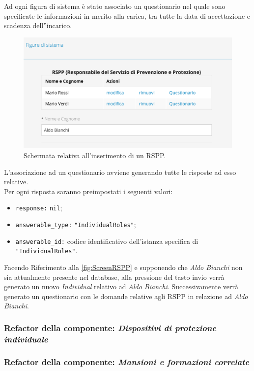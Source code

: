 	Ad ogni figura di sistema è stato associato un questionario nel quale sono specificate le informazioni in merito alla carica, tra tutte la data di accettazione e scadenza dell''incarico.
	\begin{figure}[H]
		\begin{center}
			\includegraphics[width=12cm]{Pics/RemoteTrueRSPP.png}
			\caption{
				Schermata relativa all'inserimento di un RSPP.}
			\label{fig:ScreenRSPP}
		\end{center}
	\end{figure}	
	  L'associazione ad un questionario avviene generando tutte le risposte ad esso relative.\\
	  Per ogni risposta saranno preimpostati i seguenti valori:
	  \begin{itemize}
		  \item \texttt{response:} \texttt{nil};
		  \item \texttt{answerable\_type:} \texttt{"IndividualRoles"};
		  \item \texttt{answerable\_id:} codice identificativo dell'istanza specifica di \texttt{"IndividualRoles"}.
	  \end{itemize}

	Facendo Riferimento alla \autoref{fig:ScreenRSPP} e  supponendo che \textit{Aldo Bianchi} non sia attualmente presente nel database, alla pressione del tasto invio verrà generato un nuovo \textit{Individual} relativo ad \textit{Aldo Bianchi}. Successivamente verrà generato un questionario con le domande relative agli RSPP in relazione ad \textit{Aldo Bianchi}.
	
\subsubsection{Refactor della componente: \textit{Dispositivi di protezione individuale}}
\subsubsection{Refactor della componente: \textit{Mansioni e formazioni correlate}}

